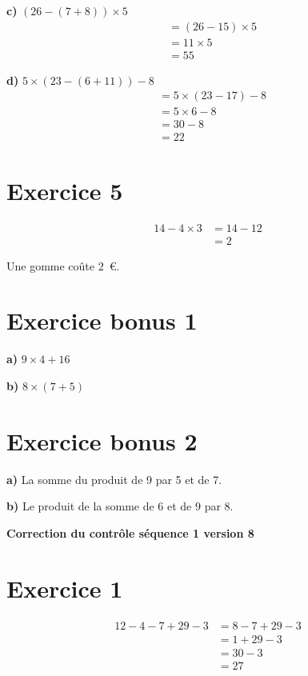 \documentclass[12pt]{extarticle}
\begin{document}
\textbf{c)} $(26 - (7 + 8)) \times 5$
\begin{align*}
&= (26 - 15) \times 5 \\
&= 11 \times 5 \\
&= 55
\end{align*}

\textbf{d)} $5 \times (23 - (6 + 11)) - 8$
\begin{align*}
&= 5 \times (23 - 17) - 8 \\
&= 5 \times 6 - 8 \\
&= 30 - 8 \\
&= 22
\end{align*}

\section*{Exercice 5}
\begin{align*}
14 - 4 \times 3 &= 14 - 12 \\
                &= 2
\end{align*}

Une gomme coûte 2~€.

\section*{Exercice bonus 1}

\textbf{a)} $9 \times 4 + 16$

\textbf{b)} $8 \times (7 + 5)$

\section*{Exercice bonus 2}

\textbf{a)} La somme du produit de 9 par 5 et de 7.

\textbf{b)} Le produit de la somme de 6 et de 9 par 8.

\newpage

\begin{center}
\Large\textbf{Correction du contrôle séquence 1 version 8}
\end{center}

\section*{Exercice 1}
\begin{align*}
12 - 4 - 7 + 29 - 3 &= 8 - 7 + 29 - 3 \\
                     &= 1 + 29 - 3 \\
                     &= 30 - 3 \\
                     &= 27
\end{align*}
\end{document}
